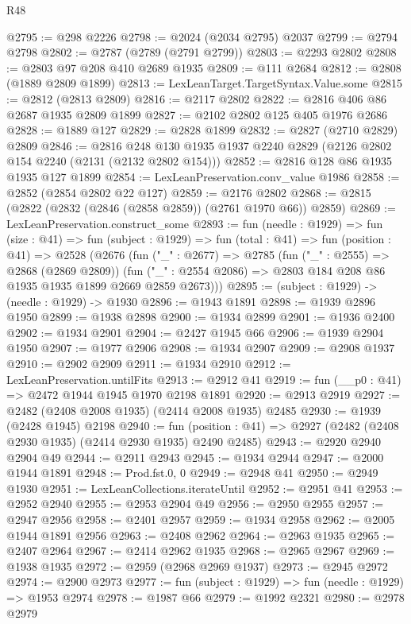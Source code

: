 \begin{lexlean}{R48}
\begin{coremodule}
@2795 := @298 @2226
@2798 := @2024 (@2034 @2795) @2037
@2799 := @2794 @2798
@2802 := @2787 (@2789 (@2791 @2799))
@2803 := @2293 @2802
@2808 := @2803 @97 @208 @410 @2689 @1935
@2809 := @111 @2684
@2812 := @2808 (@1889 @2809 @1899)
@2813 := LexLeanTarget.TargetSyntax.Value.some
@2815 := @2812 (@2813 @2809)
@2816 := @2117 @2802
@2822 := @2816 @406 @86 @2687 @1935 @2809 @1899
@2827 := @2102 @2802 @125 @405 @1976 @2686
@2828 := @1889 @127
@2829 := @2828 @1899
@2832 := @2827 (@2710 @2829) @2809
@2846 := @2816 @248 @130 @1935 @1937 @2240 @2829 (@2126 @2802 @154 @2240 (@2131 (@2132 @2802 @154)))
@2852 := @2816 @128 @86 @1935 @1935 @127 @1899
@2854 := LexLeanPreservation.conv_value @1986
@2858 := @2852 (@2854 @2802 @22 @127)
@2859 := @2176 @2802
@2868 := @2815 (@2822 (@2832 (@2846 (@2858 @2859)) (@2761 @1970 @66)) @2859)
@2869 := LexLeanPreservation.construct_some
@2893 := fun (needle : @1929) =>
  fun (size : @41) =>
  fun (subject : @1929) =>
  fun (total : @41) =>
  fun (position : @41) =>
  @2528
    (@2676
      (fun ("_" : @2677) =>
      @2785
        (fun ("_" : @2555) => @2868 (@2869 @2809))
        (fun ("_" : @2554 @2086) => @2803 @184 @208 @86 @1935 @1935 @1899 @2669 @2859 @2673)))
@2895 := (subject : @1929) -> (needle : @1929) -> @1930
@2896 := @1943 @1891
@2898 := @1939 @2896 @1950
@2899 := @1938 @2898
@2900 := @1934 @2899
@2901 := @1936 @2400
@2902 := @1934 @2901
@2904 := @2427 @1945 @66
@2906 := @1939 @2904 @1950
@2907 := @1977 @2906
@2908 := @1934 @2907
@2909 := @2908 @1937
@2910 := @2902 @2909
@2911 := @1934 @2910
@2912 := LexLeanPreservation.untilFits
@2913 := @2912 @41
@2919 := fun (__p0 : @41) => @2472 @1944 @1945 @1970 @2198 @1891
@2920 := @2913 @2919
@2927 := @2482 (@2408 @2008 @1935) (@2414 @2008 @1935) @2485
@2930 := @1939 (@2428 @1945) @2198
@2940 := fun (position : @41) => @2927 (@2482 (@2408 @2930 @1935) (@2414 @2930 @1935) @2490 @2485)
@2943 := @2920 @2940 @2904 @49
@2944 := @2911 @2943
@2945 := @1934 @2944
@2947 := @2000 @1944 @1891
@2948 := Prod.fst.{0, 0}
@2949 := @2948 @41
@2950 := @2949 @1930
@2951 := LexLeanCollections.iterateUntil
@2952 := @2951 @41
@2953 := @2952 @2940
@2955 := @2953 @2904 @49
@2956 := @2950 @2955
@2957 := @2947 @2956
@2958 := @2401 @2957
@2959 := @1934 @2958
@2962 := @2005 @1944 @1891 @2956
@2963 := @2408 @2962
@2964 := @2963 @1935
@2965 := @2407 @2964
@2967 := @2414 @2962 @1935
@2968 := @2965 @2967
@2969 := @1938 @1935
@2972 := @2959 (@2968 @2969 @1937)
@2973 := @2945 @2972
@2974 := @2900 @2973
@2977 := fun (subject : @1929) => fun (needle : @1929) => @1953 @2974
@2978 := @1987 @66
@2979 := @1992 @2321
@2980 := @2978 @2979

\end{coremodule}
\end{lexlean}
